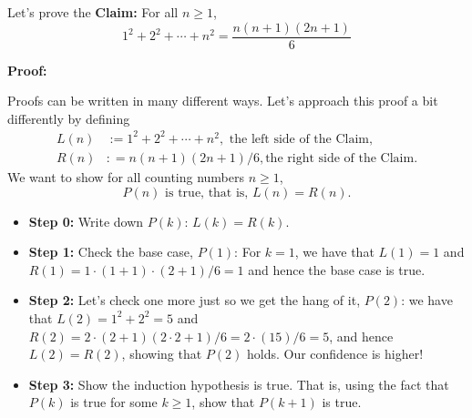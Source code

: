 \begin{example} 
\label{ex:SumIntegersSquared}
Let's prove the \textbf{Claim:}  For all $n \geq 1$, 
\begin{equation}
    \label{eqn:SumFirstIntegersSquared}
    1^2+2^2 +  \cdots + n^2 = \frac{n(n + 1)(2n + 1)}{6}
\end{equation}
\end{example}

\textbf{Proof:} 


Proofs can be written in many different ways. Let's approach this proof a bit differently by defining 
\begin{equation}
    \begin{aligned}
    L(n)&:= 1^2+2^2  + \cdots + n^2, \text{ the left side of the Claim}, \\
    R(n) &: =n(n+ 1)(2n + 1)/6, \text{the right side of the Claim.}
    \end{aligned}    
\end{equation} 
We want to show for all counting numbers $n\ge 1$,
$$ P(n) \text{ is true, that is, } L(n)=R(n).$$


    \begin{itemize}
    \item \textbf{Step 0:} Write down $P(k)$: $L(k)=R(k)$. 
        \item \textbf{Step 1:} Check the base case, $P(1)$: For  $k=1$, we have that $L(1) = 1$ and $R(1) =  1 \cdot (1 + 1) \cdot (2 + 1)/6 = 1$ and hence the base case is true. 
         \item \textbf{Step 2:} Let's check one more just so we get the hang of it, $P(2)$: we have that $ L(2)= 1^2 + 2^2= 5$ and $R(2)= 2 \cdot (2 + 1)(2\cdot 2 + 1)/6 =2 \cdot  (15)/6 = 5$, and hence $L(2)=R(2)$, showing that $P(2)$ holds. Our confidence is higher! 
        \item \textbf{Step 3:} Show the induction hypothesis is true. That is, using the fact that $P(k)$ is true for some $k \ge 1$, show that $P(k+1)$ is true.\\
  
    \end{itemize}

